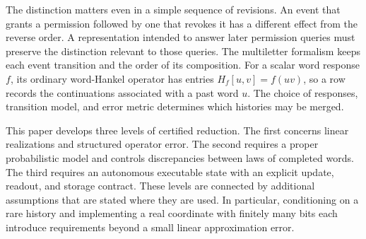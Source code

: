 The distinction matters even in a simple sequence of revisions.
An event that grants a permission followed by one that revokes it has a
different effect from the reverse order. A representation intended to
answer later permission queries must preserve the distinction relevant
to those queries. The multiletter formalism keeps each event transition
and the order of its composition. For a scalar word response $f$, its
ordinary word-Hankel operator has entries $H_f[u,v]=f(uv)$, so a row
records the continuations associated with a past word $u$. The choice of
responses, transition model, and error metric determines which histories
may be merged.

This paper develops three levels of certified reduction. The first
concerns linear realizations and structured operator error. The second
requires a proper probabilistic model and controls discrepancies between
laws of completed words. The third requires an autonomous executable
state with an explicit update, readout, and storage contract.
These levels are connected by additional assumptions that are stated
where they are used. In particular, conditioning on a rare history and
implementing a real coordinate with finitely many bits each introduce
requirements beyond a small linear approximation error.

